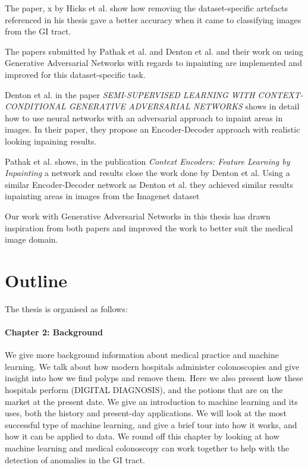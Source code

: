 The paper, x by Hicks et al. show how removing the dataset-specific artefacts referenced in his thesis gave a better accuracy when it came to classifying images from the GI tract.


The papers submitted by Pathak et al. and Denton et al. and their work on using Generative Adversarial Networks with regards to inpainting are implemented and improved for this dataset-specific task.

Denton et al. in the paper \textit{SEMI-SUPERVISED LEARNING WITH
CONTEXT-CONDITIONAL GENERATIVE
ADVERSARIAL NETWORKS} shows in detail how to use neural networks with an adversarial approach to inpaint areas in images. In their paper, they propose an Encoder-Decoder approach with realistic looking inpaining results.


Pathak et al. shows, in the publication \textit{Context Encoders: Feature Learning by Inpainting} a network and results close the work done by Denton et al. Using a similar Encoder-Decoder network as Denton et al. they achieved similar results inpainting areas in images from the Imagenet dataset

Our work with Generative Adversarial Networks in this thesis has drawn inspiration from both papers and improved the work to better suit the medical image domain.















\section{Outline}
The thesis is organised as follows:

\paragraph{Chapter 2: Background}
We give more background information about medical practice and machine learning.
We talk about how modern hospitals administer colonoscopies and give insight into how we find polyps and remove them. Here we also present how these hospitals perform (DIGITAL DIAGNOSIS), and the potions that are on the market at the present date. 
We give an introduction to machine learning and its uses, both the history and present-day applications. We will look at the most successful type of machine learning, and give a brief tour into how it works, and how it can be applied to data.
We round off this chapter by looking at how machine learning and medical colonoscopy can work together to help with the detection of anomalies in the GI tract.

